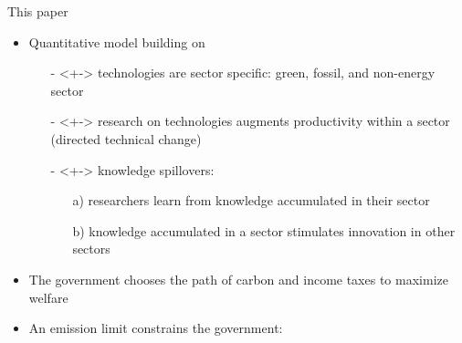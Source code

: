 \documentclass[11pt,aspectratio=169]{beamer}
\begin{document}
\begin{frame}{This paper}
	\vspace{-2mm}
	\begin{itemize}
		\item<+-> Quantitative model building on \cite{Fried2018ClimateAnalysis} 
		\vspace{2mm}
		\begin{itemize}
			\item[-]<+-> \alert{technologies are sector specific}: green, fossil, and non-energy sector 
			\vspace{1mm}
			\item[-]<+-> \alert{research} on technologies augments productivity within a sector \\ \footnotesize{(directed technical change) }
			\vspace{1mm}
			\item[-]<+-> \alert{knowledge spillovers}: 
			\begin{enumerate}
				\item[a)] researchers learn from knowledge accumulated in their sector
				\item[b)] knowledge accumulated in a sector stimulates innovation in other sectors 
			\end{enumerate}%
		\end{itemize}
		\vspace{2mm}
		\item<+->   The government   chooses the \alert{path of carbon and income taxes} to maximize welfare\vspace{2mm}
		\item<+-> An \alert{emission limit} constrains the government: 
	\end{itemize}
	\pause
	\vspace{0mm}
	\centering
\end{frame}
\end{document}
